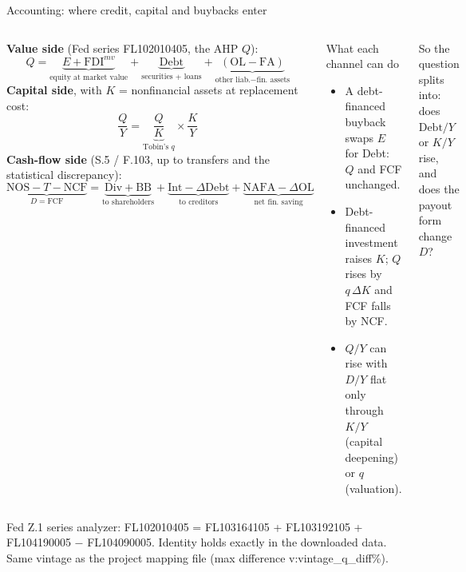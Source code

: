 \documentclass[aspectratio=169,10pt,t]{beamer}
\newcommand{\val}[1]{\csname v:#1\endcsname}
\newcommand{\src}[1]{\vfill{\tiny\textcolor{muted}{#1}\par}\vspace{0.1cm}}
\begin{document}
\begin{frame}{Accounting: where credit, capital and buybacks enter}
\vspace{0.1cm}
\begin{columns}[T]
{\small\textbf{Value side} (Fed series FL102010405, the AHP $Q$):}
{\footnotesize\[
Q=\underbrace{E+\mathrm{FDI}^{mv}}_{\text{equity at market value}}+\underbrace{\mathrm{Debt}}_{\text{securities + loans}}+\underbrace{(\mathrm{OL}-\mathrm{FA})}_{\text{other liab.} - \text{fin. assets}}
\]}
{\small\textbf{Capital side}, with $K$ = nonfinancial assets at replacement cost:}
{\footnotesize\[
\frac{Q}{Y}=\underbrace{\frac{Q}{K}}_{\text{Tobin's }q}\times\frac{K}{Y}
\]}
{\small\textbf{Cash-flow side} (S.5 / F.103, up to transfers and the statistical discrepancy):}
{\footnotesize\[
\underbrace{\mathrm{NOS}-T-\mathrm{NCF}}_{D=\mathrm{FCF}}=\underbrace{\mathrm{Div}+\mathrm{BB}}_{\text{to shareholders}}+\underbrace{\mathrm{Int}-\Delta\mathrm{Debt}}_{\text{to creditors}}+\underbrace{\mathrm{NAFA}-\Delta\mathrm{OL}}_{\text{net fin.\ saving}}
\]}
\begin{block}{What each channel can do}
\small
\begin{itemize}\setlength{\itemsep}{0.08cm}
\item A debt-financed buyback swaps $E$ for Debt: $Q$ and FCF unchanged.
\item Debt-financed investment raises $K$; $Q$ rises by $q\,\Delta K$ and FCF falls by NCF.
\item $Q/Y$ can rise with $D/Y$ flat only through $K/Y$ (capital deepening) or $q$ (valuation).
\end{itemize}
\end{block}
\vspace{0.15cm}
{\footnotesize So the question splits into: does $\mathrm{Debt}/Y$ or $K/Y$ rise, and does the payout form change $D$?}
\end{columns}
\src{Fed Z.1 series analyzer: FL102010405 = FL103164105 + FL103192105 + FL104190005 $-$ FL104090005. Identity holds exactly in the downloaded data. Same vintage as the project mapping file (max difference \val{vintage_q_diff}\%).}
\end{frame}
\end{document}

